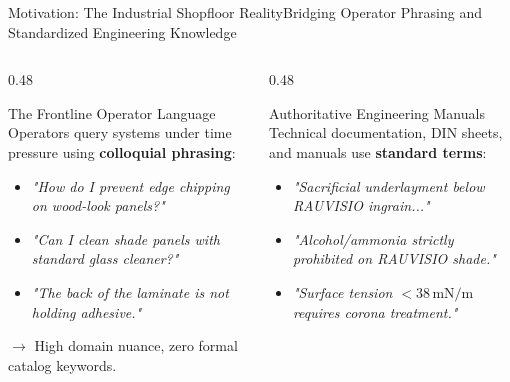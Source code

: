 \documentclass[aspectratio=169,10pt]{beamer}
\begin{document}
\begin{frame}{Motivation: The Industrial Shopfloor Reality}{Bridging Operator Phrasing and Standardized Engineering Knowledge}
  \begin{columns}[T]
    \begin{column}{0.48\textwidth}
      \begin{block}{The Frontline Operator Language}
        \scriptsize
        Operators query systems under time pressure using \textbf{colloquial phrasing}:
        \begin{itemize}\setlength\itemsep{0.03ex}
          \item \textit{"How do I prevent edge chipping on wood-look panels?"}
          \item \textit{"Can I clean shade panels with standard glass cleaner?"}
          \item \textit{"The back of the laminate is not holding adhesive."}
        \end{itemize}
        $\rightarrow$ High domain nuance, zero formal catalog keywords.
      \end{block}
    \end{column}
    \begin{column}{0.48\textwidth}
      \begin{block}{Authoritative Engineering Manuals}
        \scriptsize
        Technical documentation, DIN sheets, and manuals use \textbf{standard terms}:
        \begin{itemize}\setlength\itemsep{0.03ex}
          \item \textit{"Sacrificial underlayment below RAUVISIO ingrain..."}
          \item \textit{"Alcohol/ammonia strictly prohibited on RAUVISIO shade."}
          \item \textit{"Surface tension $< 38\,\text{mN/m}$ requires corona treatment."}
        \end{itemize}
      \end{block}
    \end{column}
  \end{columns}


\end{frame}
\end{document}
